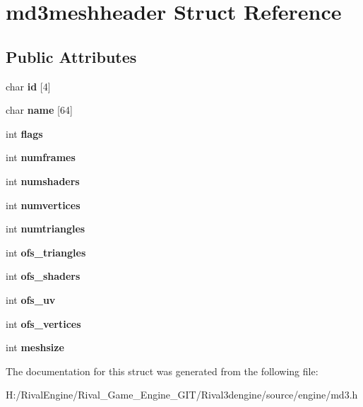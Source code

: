 \hypertarget{structmd3meshheader}{}\section{md3meshheader Struct Reference}
\label{structmd3meshheader}
\subsection*{Public Attributes}
\begin{DoxyCompactItemize}
\item 
\mbox{\label{structmd3meshheader_a017ffb2b3c898ee6c3564f9571671032}} 
char {\bfseries id} \mbox{[}4\mbox{]}
\item 
\mbox{\label{structmd3meshheader_a6cf88488c5aca72d785736e135d4f141}} 
char {\bfseries name} \mbox{[}64\mbox{]}
\item 
\mbox{\label{structmd3meshheader_acc6f238a03034fe54d43bc1202cdbe88}} 
int {\bfseries flags}
\item 
\mbox{\label{structmd3meshheader_a7089beafa0bb364014dae363ffba8bf7}} 
int {\bfseries numframes}
\item 
\mbox{\label{structmd3meshheader_ad34857cadda846f37a2b8f1a913958cf}} 
int {\bfseries numshaders}
\item 
\mbox{\label{structmd3meshheader_a0adaca8fa9802e13880b6750ba3dab55}} 
int {\bfseries numvertices}
\item 
\mbox{\label{structmd3meshheader_a53fcf7d83e07b9c45a2d7dc0b72bc2eb}} 
int {\bfseries numtriangles}
\item 
\mbox{\label{structmd3meshheader_a788d52aa8efc4b7ac49370eb99d7bc1b}} 
int {\bfseries ofs\+\_\+triangles}
\item 
\mbox{\label{structmd3meshheader_adf3d901c309ffb638aaa2545e3aeb002}} 
int {\bfseries ofs\+\_\+shaders}
\item 
\mbox{\label{structmd3meshheader_a9697ba9809aed55b3f2d3cd1c39fca17}} 
int {\bfseries ofs\+\_\+uv}
\item 
\mbox{\label{structmd3meshheader_ab3ac87f349407e797e1ccf96a1be153b}} 
int {\bfseries ofs\+\_\+vertices}
\item 
\mbox{\label{structmd3meshheader_ad5a8235cc881367943a1cf44980cf789}} 
int {\bfseries meshsize}
\end{DoxyCompactItemize}


The documentation for this struct was generated from the following file\+:\begin{DoxyCompactItemize}
\item 
H\+:/\+Rival\+Engine/\+Rival\+\_\+\+Game\+\_\+\+Engine\+\_\+\+G\+I\+T/\+Rival3dengine/source/engine/md3.\+h\end{DoxyCompactItemize}
